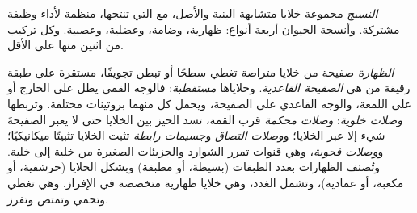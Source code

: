 \begin{definition}[النسيج]\label{def:b1:body-plans-tissues:tissue}
\emph{النسيج} مجموعة خلايا متشابهة البنية والأصل، مع
 التي تنتجها، منظمة لأداء وظيفة مشتركة. وأنسجة
الحيوان أربعة أنواع: ظهارية، وضامة، وعضلية، وعصبية. وكل  تركيب من
اثنين منها على الأقل.
\end{definition}

\begin{definition}\label{def:b1:body-plans-tissues:epithelium}
\emph{الظهارة} صفيحة من خلايا متراصة تغطي سطحًا أو تبطن
تجويفًا، مستقرة على طبقة رقيقة من  هي
\emph{الصفيحة القاعدية}. وخلاياها
\emph{مستقطبة}: فالوجه القمي يطل على الخارج
أو على اللمعة، والوجه القاعدي على الصفيحة، ويحمل كل منهما بروتينات
مختلفة. وتربطها \emph{وصلات خلوية}:
\emph{وصلات محكمة} قرب القمة، تسد الحيز بين الخلايا حتى لا يعبر
الصفيحةَ شيء إلا عبر الخلايا؛ و\emph{وصلات التصاق}
و\emph{جسيمات رابطة} تثبت الخلايا تثبيتًا ميكانيكيًا؛
و\emph{وصلات فجوية}، وهي قنوات تمرر الشوارد والجزيئات الصغيرة من
خلية إلى خلية. وتُصنف الظهارات بعدد الطبقات (بسيطة، أو مطبقة) وبشكل
الخلايا (حرشفية، أو مكعبة، أو عمادية)، وتشمل الغدد، وهي خلايا ظهارية
متخصصة في الإفراز. وهي تغطي وتحمي وتمتص وتفرز.
\end{definition}

